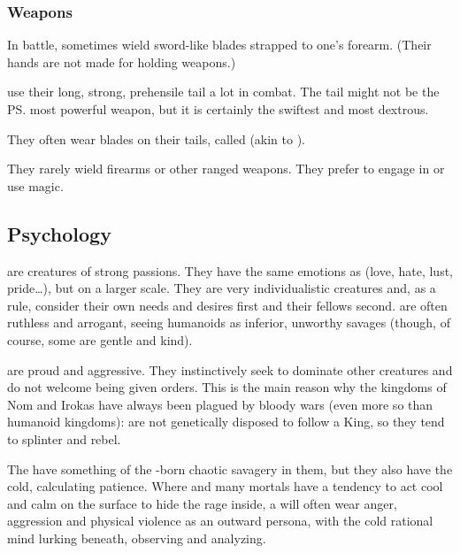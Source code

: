 \subsubsection{Weapons}
\index{\skekrathuin}
In battle, \dragons{} sometimes wield \skekrathuins{}\dash sword-like blades strapped to one's forearm. 
(Their hands are not made for holding weapons.)

\Dragons{} use their long, strong, prehensile tail a lot in combat. 
The tail might not be the \ps{\dragon} most powerful weapon, but it is certainly the swiftest and most dextrous. 

\index{\zrekklakh}
They often wear blades on their tails, called \zrekklakh{} (akin to ). 

They rarely wield firearms or other ranged weapons. 
They prefer to engage in \melee{} or use magic. 









\subsection{Psychology}
\Dragons{} are creatures of strong passions. They have the same emotions as \humans{} (love, hate, lust, pride\ldots{}), but on a larger scale. They are very individualistic creatures and, as a rule, consider their own needs and desires first and their fellows second.
\Dragons{} are often ruthless and arrogant, seeing humanoids as inferior, unworthy savages (though, of course, some \dragons{} are gentle and kind). 

\Dragons{} are proud and aggressive. They instinctively seek to dominate other creatures and do not welcome being given orders. This is the main reason why the \draconic{} kingdoms of Nom and Irokas have always been plagued by bloody wars (even more so than humanoid kingdoms): \Dragons{} are not genetically disposed to follow a King, so they tend to splinter and rebel. 

The \dragons{} have something of the \xs-born chaotic savagery in them, but they also have the cold, calculating \ophidian{} patience. 
Where \resphain{} and many mortals have a tendency to act cool and calm on the surface to hide the rage inside, a \dragon{} will often wear anger, aggression and physical violence as an outward persona, with the cold rational mind lurking beneath, observing and analyzing. 

